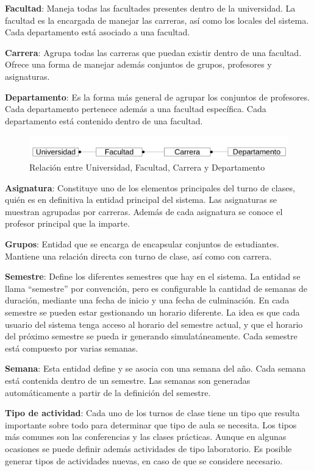 \textbf{Facultad}: Maneja todas las facultades presentes dentro de la universidad. La facultad es la encargada de manejar las carreras, así como los locales del sistema. Cada departamento está asociado a una facultad.

\textbf{Carrera}: Agrupa todas las carreras que puedan existir dentro de una facultad. Ofrece una forma de manejar además conjuntos de grupos, profesores y asignaturas.

\textbf{Departamento}: Es la forma más general de agrupar los conjuntos de profesores. Cada departamento pertenece además a una facultad específica. Cada departamento está contenido dentro de una facultad.

\begin{figure}[h!]
	\centering
	\includegraphics[width=1\linewidth]{images/Chapter 3/univ_fac_carr_dep.png}
	\caption{Relación entre Universidad, Facultad, Carrera y Departamento}
	\label{fig:department_relation}
\end{figure}

\textbf{Asignatura}: Constituye uno de los elementos principales del turno de clases, quién es en definitiva la entidad principal del sistema. Las asignaturas se muestran agrupadas por carreras. Además de cada asignatura se conoce el profesor principal que la imparte.

\textbf{Grupos}: Entidad que se encarga de encapsular conjuntos de estudiantes. Mantiene una relación directa con turno de clase, así como con carrera. 

\textbf{Semestre}: Define los diferentes semestres que hay en el sistema. La entidad se llama “semestre” por convención, pero es configurable la cantidad de semanas de duración, mediante una fecha de inicio y una fecha de culminación. En cada semestre se pueden estar gestionando un horario diferente. La idea es que cada usuario del sistema tenga acceso al horario del semestre actual, y que el horario del próximo semestre se pueda ir generando simulatáneamente. Cada semestre está compuesto por varias semanas.

\textbf{Semana}: Esta entidad define y se asocia con una semana del año. Cada semana está contenida dentro de un semestre. Las semanas son generadas automáticamente a partir de la definición del semestre.

\textbf{Tipo de actividad}: Cada uno de los turnos de clase tiene un tipo que resulta importante sobre todo
 para determinar que tipo de aula se necesita. Los tipos más comunes son las conferencias y las clases
 prácticas. Aunque en algunas ocasiones se puede definir además actividades de tipo laboratorio. Es posible generar tipos de actividades nuevas, en caso de que se considere necesario.

